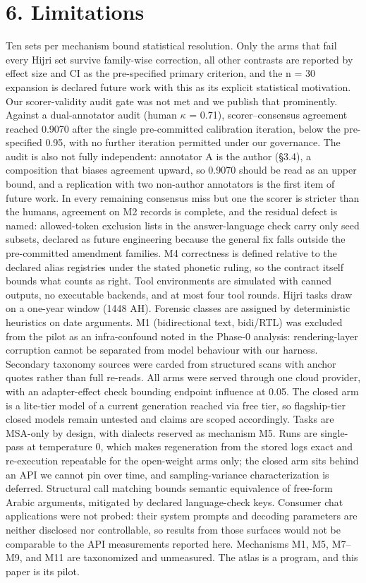 \documentclass[11pt]{article}
\begin{document}
\section{6. Limitations}\label{limitations}

Ten sets per mechanism bound statistical resolution. Only the arms that fail every Hijri set survive family-wise correction, all other contrasts are reported by effect size and CI as the pre-specified primary criterion, and the n = 30 expansion is declared future work with this as its explicit statistical motivation. Our scorer-validity audit gate was not met and we publish that prominently. Against a dual-annotator audit (human $\kappa$ = 0.71), scorer--consensus agreement reached 0.9070 after the single pre-committed calibration iteration, below the pre-specified 0.95, with no further iteration permitted under our governance. The audit is also not fully independent: annotator A is the author (\S{}3.4), a composition that biases agreement upward, so 0.9070 should be read as an upper bound, and a replication with two non-author annotators is the first item of future work. In every remaining consensus miss but one the scorer is stricter than the humans, agreement on M2 records is complete, and the residual defect is named: allowed-token exclusion lists in the answer-language check carry only seed subsets, declared as future engineering because the general fix falls outside the pre-committed amendment families. M4 correctness is defined relative to the declared alias registries under the stated phonetic ruling, so the contract itself bounds what counts as right. Tool environments are simulated with canned outputs, no executable backends, and at most four tool rounds. Hijri tasks draw on a one-year window (1448 AH). Forensic classes are assigned by deterministic heuristics on date arguments. M1 (bidirectional text, bidi/RTL) was excluded from the pilot as an infra-confound noted in the Phase-0 analysis: rendering-layer corruption cannot be separated from model behaviour with our harness. Secondary taxonomy sources were carded from structured scans with anchor quotes rather than full re-reads. All arms were served through one cloud provider, with an adapter-effect check bounding endpoint influence at 0.05. The closed arm is a lite-tier model of a current generation reached via free tier, so flagship-tier closed models remain untested and claims are scoped accordingly. Tasks are MSA-only by design, with dialects reserved as mechanism M5. Runs are single-pass at temperature 0, which makes regeneration from the stored logs exact and re-execution repeatable for the open-weight arms only; the closed arm sits behind an API we cannot pin over time, and sampling-variance characterization is deferred. Structural call matching bounds semantic equivalence of free-form Arabic arguments, mitigated by declared language-check keys. Consumer chat applications were not probed: their system prompts and decoding parameters are neither disclosed nor controllable, so results from those surfaces would not be comparable to the API measurements reported here. Mechanisms M1, M5, M7--M9, and M11 are taxonomized and unmeasured. The atlas is a program, and this paper is its pilot.
\end{document}
